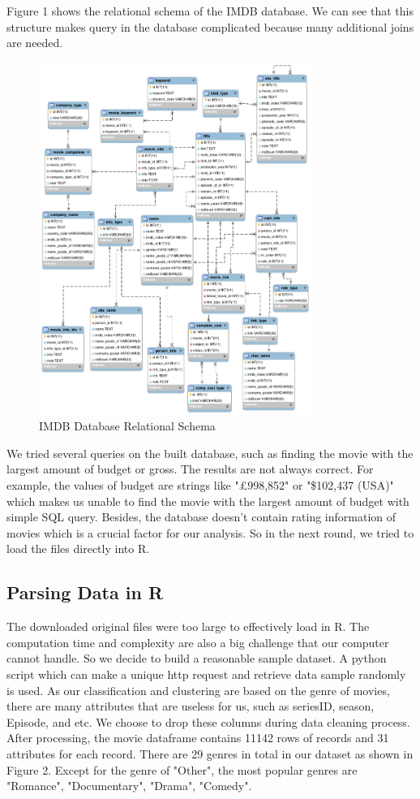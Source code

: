 \documentclass[conference]{IEEEtran}
\begin{document}
Figure 1 shows the relational schema of the IMDB database. We can see that this structure makes query in the database complicated because many additional joins are needed.

\begin{figure}
	\centering
	\includegraphics[width=3.5in]{ERgraph.png}
	\caption{IMDB Database Relational Schema}
	\label{fig:side:a}
\end{figure}

We tried several queries on the built database, such as finding the movie with the largest amount of budget or gross. The results are not always correct. For example, the values of budget are strings like "\pounds 998,852" or "\$102,437 (USA)" which makes us unable to find the movie with the largest amount of budget with simple SQL query. Besides, the database doesn't contain rating information of movies which is a crucial factor for our analysis. So in the next round, we tried to load the files directly into R.

\subsection{Parsing Data in R}

The downloaded original files were too large to effectively load in R. The computation time and complexity are also a big challenge that our computer cannot handle. So we decide to build a reasonable sample dataset. A python script which can make a unique http request and retrieve data sample randomly is used. As our classification and clustering are based on the genre of movies, there are many attributes that are useless for us, such as seriesID, season, Episode, and etc. We choose to drop these columns during data cleaning process. After processing, the movie dataframe contains 11142 rows of records and 31 attributes for each record.  There are 29 genres in total in our dataset as shown in Figure 2. Except for the genre of "Other", the most popular genres are "Romance", "Documentary", "Drama", "Comedy".
\end{document}
